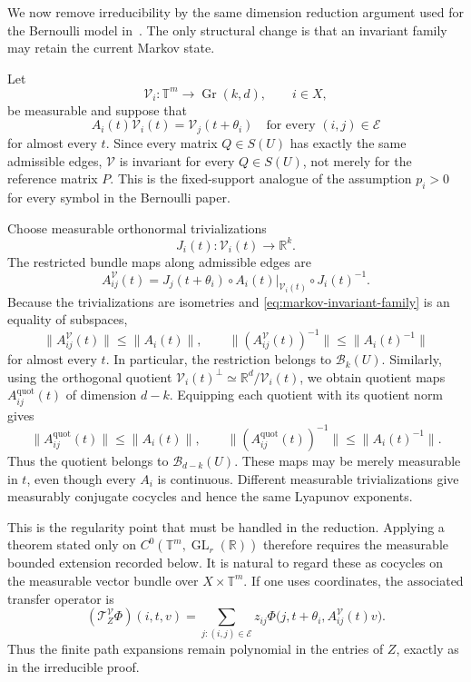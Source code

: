 \documentclass[11pt,a4paper]{amsart}
\newcommand{\T}{\mathbb T}
\newcommand{\R}{\mathbb R}
\newcommand{\Gr}{\operatorname{Gr}}
\newcommand{\cE}{\mathcal E}
\begin{document}
We now remove irreducibility by the same dimension reduction argument
used for the Bernoulli model in~\cite[Section~3 and the proof of
Theorem~1]{BST}.  The only structural change is that an invariant
family may retain the current Markov state.

Let
\[
 \mathcal V_i:\T^m\longrightarrow\Gr(k,d),
 \qquad i\in X,
\]
be measurable and suppose that
\begin{equation}\label{eq:markov-invariant-family}
 A_i(t)\mathcal V_i(t)
 =\mathcal V_j(t+\theta_i)
 \quad\text{for every }(i,j)\in\cE
\end{equation}
for almost every \(t\).  Since every matrix \(Q\in S(U)\) has exactly
the same admissible edges, \(\boldsymbol{\mathcal V}\) is invariant
for every \(Q\in S(U)\), not merely for the reference matrix \(P\).
This is the fixed-support analogue of the assumption \(p_i>0\) for
every symbol in the Bernoulli paper.

Choose measurable orthonormal trivializations
\[
 J_i(t):\mathcal V_i(t)\longrightarrow\R^k.
\]
The restricted bundle maps along admissible edges are
\[
 A^{\mathcal V}_{ij}(t)
 =
 J_j(t+\theta_i)\circ
 A_i(t)|_{\mathcal V_i(t)}
 \circ J_i(t)^{-1}.
\]
Because the trivializations are isometries and
\eqref{eq:markov-invariant-family} is an equality of subspaces,
\begin{equation}\label{eq:restricted-essential-bounds}
 \|A^{\mathcal V}_{ij}(t)\|\leq\|A_i(t)\|,
 \qquad
 \|(A^{\mathcal V}_{ij}(t))^{-1}\|
 \leq\|A_i(t)^{-1}\|
\end{equation}
for almost every \(t\).  In particular, the restriction belongs to
\(\mathcal B_k(U)\).
Similarly, using the orthogonal quotient
\(\mathcal V_i(t)^\perp\simeq\R^d/\mathcal V_i(t)\), we obtain
quotient maps \(A^{\mathrm{quot}}_{ij}(t)\) of dimension \(d-k\).
Equipping each quotient with its quotient norm gives
\begin{equation}\label{eq:quotient-essential-bounds}
 \|A^{\mathrm{quot}}_{ij}(t)\|\leq\|A_i(t)\|,
 \qquad
 \|(A^{\mathrm{quot}}_{ij}(t))^{-1}\|
 \leq\|A_i(t)^{-1}\|.
\end{equation}
Thus the quotient belongs to \(\mathcal B_{d-k}(U)\).  These maps may
be merely measurable in \(t\), even though every \(A_i\) is
continuous.  Different measurable
trivializations give measurably conjugate cocycles and hence the same
Lyapunov exponents.

This is the regularity point that must be handled in the reduction.
Applying a theorem stated only on
\(C^0(\mathbb T^m,\operatorname{GL}_r(\mathbb R))\) therefore requires
the measurable bounded extension recorded below.
It is natural to regard these as cocycles on the measurable vector
bundle over \(X\times\T^m\).  If one uses coordinates, the associated
transfer operator is
\[
 (\mathcal T_Z^{\mathcal V}\Phi)(i,t, v)
 =
 \sum_{j:(i,j)\in\cE}z_{ij}
 \Phi\bigl(j,t+\theta_i,
       A^{\mathcal V}_{ij}(t)v\bigr).
\]
Thus the finite path expansions remain polynomial in the entries of
\(Z\), exactly as in the irreducible proof.
\end{document}

